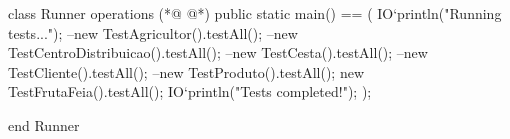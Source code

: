 \begin{vdmpp}[breaklines=true]
class Runner
  operations
(*@
\label{main:3}
@*)
    public static main() == (
      IO`println("Running tests...");
      --new TestAgricultor().testAll();
      --new TestCentroDistribuicao().testAll();
      --new TestCesta().testAll();
      --new TestCliente().testAll();
      --new TestProduto().testAll();
      new TestFrutaFeia().testAll();
      IO`println("Tests completed!");
    );
    
end Runner
\end{vdmpp}

